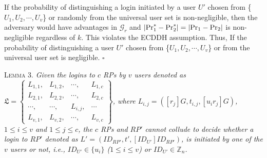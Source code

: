 {If the probability of distinguishing a login initiated by a user $U'$ chosen from \{${U_1}, {U_2}, \cdots, {U_v}$\} or randomly from the universal user set is non-negligible,
    then the adversary would have advantages in $\mathcal{G}_r$ and $|{\rm Pr}^*_1-{\rm Pr}^*_2|=|{\rm Pr}_1-{\rm Pr}_2|$ is non-negligible regardless of $k$.
This violates the ECDDH assumption.
Thus, If the probability of distinguishing a user $U'$ chosen from \{${U_1}, {U_2}, \cdots, {U_v}$\} or from the universal user set is negligible.
\hfill $\square$


\oldc
\vspace{1mm}
\noindent\textsc{Lemma 3.} {\em Given
    the logins to $c$ RPs by $v$ users denoted as
 $\mathfrak{L}=\left \{ \begin{matrix}
L_{1,1},&L_{1,2},&\cdots,&L_{1,c}\\
L_{2,1},& L_{2,2},&\cdots,&L_{2,c}\\
\cdots,&\cdots,&L_{i,j},&\cdots\\
L_{v,1},&L_{v,2},&\cdots,&L_{v,c}
\end{matrix}\right\}$, where
 $L_{i, j}=([r_j]G, t_{i,j}, [u_ir_j]G)$, $1 \le i \le v$ and $1 \le j \le c$,
the $c$ RPs and $RP'$ cannot collude to decide whether a login to $RP'$ denoted as $L' = (ID_{RP'}, t', [ID_{U'}]ID_{RP'})$, is initiated by one of the $v$ users or not, i.e., $ID_{U'} \in \{u_i\}$ ($1 \leq i \leq v$) or $ID_{U'} \in \mathbb{Z}_n$.}





}
